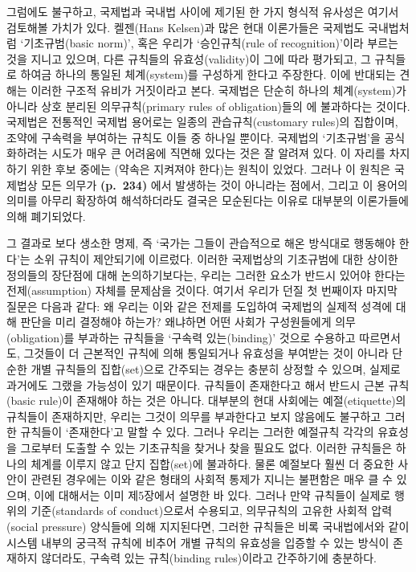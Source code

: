 그럼에도 불구하고, 국제법과 국내법 사이에 제기된 한 가지 형식적 유사성은
여기서 검토해볼 가치가 있다. 켈젠(Hans Kelsen)과 많은 현대 이론가들은
국제법도 국내법처럼 `기초규범(basic norm)', 혹은 우리가 `승인규칙(rule
of recognition)'이라 부르는 것을 지니고 있으며, 다른 규칙들의
유효성(validity)이 그에 따라 평가되고, 그 규칙들로 하여금 하나의 통일된
체계(system)를 구성하게 한다고 주장한다. 이에 반대되는 견해는 이러한
구조적 유비가 거짓이라고 본다. 국제법은 단순히 하나의 체계(system)가
아니라 상호 분리된 의무규칙(primary rules of obligation)들의
에 불과하다는 것이다. 국제법은 전통적인 국제법 용어로는
일종의 관습규칙(customary rules)의 집합이며, 조약에 구속력을 부여하는
규칙도 이들 중 하나일 뿐이다. 국제법의 `기초규범'을 공식화하려는 시도가
매우 큰 어려움에 직면해 있다는 것은 잘 알려져 있다. 이 자리를 차지하기
위한 후보 중에는 (약속은 지켜져야 한다)는
원칙이 있었다. 그러나 이 원칙은 국제법상 모든 의무가 \textbf{(p.~234)}
에서 발생하는 것이 아니라는 점에서, 그리고 이 용어의
의미를 아무리 확장하여 해석하더라도 결국은 모순된다는 이유로 대부분의
이론가들에 의해 폐기되었다.

그 결과로 보다 생소한 명제, 즉 `국가는 그들이 관습적으로 해온 방식대로
행동해야 한다'는 소위 규칙이 제안되기에 이르렀다. 이러한 국제법상의
기초규범에 대한 상이한 정의들의 장단점에 대해 논의하기보다는, 우리는
그러한 요소가 반드시 있어야 한다는 전제(assumption) 자체를 문제삼을
것이다. 여기서 우리가 던질 첫 번째이자 마지막 질문은 다음과 같다: 왜
우리는 이와 같은  전제를 도입하여 국제법의 실제적
성격에 대해 판단을 미리 결정해야 하는가? 왜냐하면 어떤 사회가
구성원들에게 의무(obligation)를 부과하는 규칙들을 `구속력 있는(binding)'
것으로 수용하고 따르면서도, 그것들이 더 근본적인 규칙에 의해 통일되거나
유효성을 부여받는 것이 아니라 단순한 개별 규칙들의 집합(set)으로
간주되는 경우는 충분히 상정할 수 있으며, 실제로 과거에도 그랬을 가능성이
있기 때문이다. 규칙들이 존재한다고 해서 반드시 근본 규칙(basic rule)이
존재해야 하는 것은 아니다. 대부분의 현대 사회에는 예절(etiquette)의
규칙들이 존재하지만, 우리는 그것이 의무를 부과한다고 보지 않음에도
불구하고 그러한 규칙들이 `존재한다'고 말할 수 있다. 그러나 우리는 그러한
예절규칙 각각의 유효성을 그로부터 도출할 수 있는 기초규칙을 찾거나 찾을
필요도 없다. 이러한 규칙들은 하나의 체계를 이루지 않고 단지 집합(set)에
불과하다. 물론 예절보다 훨씬 더 중요한 사안이 관련된 경우에는 이와 같은
형태의 사회적 통제가 지니는 불편함은 매우 클 수 있으며, 이에 대해서는
이미 제5장에서 설명한 바 있다. 그러나 만약 규칙들이 실제로 행위의
기준(standards of conduct)으로서 수용되고, 의무규칙의 고유한 사회적
압력(social pressure) 양식들에 의해 지지된다면, 그러한 규칙들은 비록
국내법에서와 같이 시스템 내부의 궁극적 규칙에 비추어 개별 규칙의
유효성을 입증할 수 있는 방식이 존재하지 않더라도, 구속력 있는
규칙(binding rules)이라고 간주하기에 충분하다.

